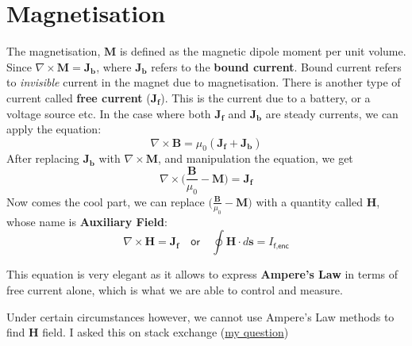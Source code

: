 \documentclass[12pt,a4paper]{extreport}
\numberwithin{equation}{chapter}
\begin{document}
    \section{Magnetisation}
    The magnetisation, $\mathbf{M}$ is defined as the magnetic dipole moment per unit volume. 
    Since $\nabla \times \mathbf{M}=\mathbf{J_b}$, where $\mathbf{J_b}$ refers to the \textbf{bound current}. Bound current refers to \textit{invisible} current in the magnet due to magnetisation. There is another type of current called \textbf{free current} ($\mathbf{J_f}$). This is the current due to a battery, or a voltage source etc. In the case where both $\mathbf{J_f}$ and $\mathbf{J_b}$ are steady currents, we can apply the equation: 
    \begin{equation}
        \nabla \times \mathbf{B} = \mu_0 (\mathbf{J_f}+\mathbf{J_b})
    \end{equation}
    After replacing $\mathbf{J_b}$ with $\nabla \times \mathbf{M}$, and manipulation the equation, we get 
    \begin{equation}
        \nabla \times \bigg(\frac{\mathbf{B}}{\mu_0}-\mathbf{M}\bigg)=\mathbf{J_f}
    \end{equation}
    Now comes the cool part, we can replace $\big(\frac{\mathbf{B}}{\mu_0}-\mathbf{M}\big)$ with a quantity called $\mathbf{H}$, whose name is \textbf{Auxiliary Field}:  
    \begin{equation}
        \boxed{\nabla \times \mathbf{H}=\mathbf{J_f}} 
        \quad\textsf{or}\quad
        \boxed{\oint \mathbf{H} \cdot d\mathbf{s} = I_\textsf{f,enc}}
    \end{equation}

    This equation is very elegant as it allows to express \textbf{Ampere's Law} in terms of free current alone, which is what we are able to control and measure. 

    Under certain circumstances however, we cannot use Ampere's Law methods to find $\mathbf{H}$ field. I asked this on stack exchange (\href{https://physics.stackexchange.com/questions/675083/when-can-we-use-amp%c3%a8res-law-methods-to-find-mathbfh-field}{my question})
    
\end{document}
